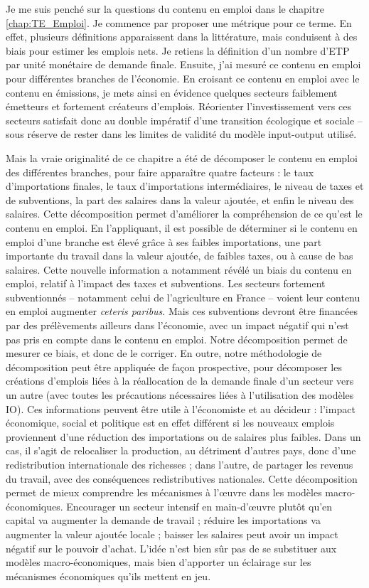 Je me suis penché sur la questions du contenu en emploi dans le chapitre \ref{chap:TE_Emploi}. Je commence par proposer une métrique pour ce terme. En effet, plusieurs définitions apparaissent dans la littérature, mais conduisent à des biais pour estimer les emplois nets. Je retiens la définition d’un nombre d’ETP par unité monétaire de demande finale.
Ensuite, j’ai mesuré ce contenu en emploi pour différentes branches de l’économie. En croisant ce contenu en emploi avec le contenu en émissions, je mets ainsi en évidence quelques secteurs faiblement émetteurs et fortement créateurs d’emplois. Réorienter l’investissement vers ces secteurs satisfait donc au double impératif d’une transition écologique et sociale – sous réserve de rester dans les limites de validité du modèle input-output utilisé.

Mais la vraie originalité de ce chapitre a été de décomposer le contenu en emploi des différentes branches, pour faire apparaître quatre facteurs : le taux d’importations finales, le taux d’importations intermédiaires, le niveau de taxes et de subventions, la part des salaires dans la valeur ajoutée, et enfin le niveau des salaires.
Cette décomposition permet d’améliorer la compréhension de ce qu’est le contenu en emploi. En l’appliquant, il est possible de déterminer si le contenu en emploi d’une branche est élevé grâce à ses faibles importations, une part importante du travail dans la valeur ajoutée, de faibles taxes, ou à cause de bas salaires.
Cette nouvelle information a notamment révélé un biais du contenu en emploi, relatif à l’impact des taxes et subventions. Les secteurs fortement subventionnés -- notamment celui de l'agriculture en France -- voient leur contenu en emploi augmenter \textit{ceteris paribus}. Mais ces subventions devront être financées par des prélèvements ailleurs dans l’économie, avec un impact négatif qui n’est pas pris en compte dans le contenu en emploi. Notre décomposition permet de mesurer ce biais, et donc de le corriger. 
En outre, notre méthodologie de décomposition peut être appliquée de façon prospective, pour décomposer les créations d’emplois liées à la réallocation de la demande finale d’un secteur vers un autre (avec toutes les précautions nécessaires liées à l’utilisation des modèles IO). Ces informations peuvent être utile à l’économiste et au décideur : l’impact économique, social et politique est en effet différent si les nouveaux emplois proviennent d’une réduction des importations ou de salaires plus faibles. Dans un cas, il s’agit de relocaliser la production, au détriment d’autres pays, donc d’une redistribution internationale des richesses ; dans l’autre, de partager les revenus du travail, avec des conséquences redistributives nationales.
Cette décomposition permet de mieux comprendre les mécanismes à l’œuvre dans les modèles macro-économiques. Encourager un secteur intensif en main-d’œuvre plutôt qu’en capital va augmenter la demande de travail ; réduire les importations va augmenter la valeur ajoutée locale ; baisser les salaires peut avoir un impact négatif sur le pouvoir d’achat. L’idée n’est bien sûr pas de se substituer aux modèles macro-économiques, mais bien d’apporter un éclairage sur les mécanismes économiques qu’ils mettent en jeu.


